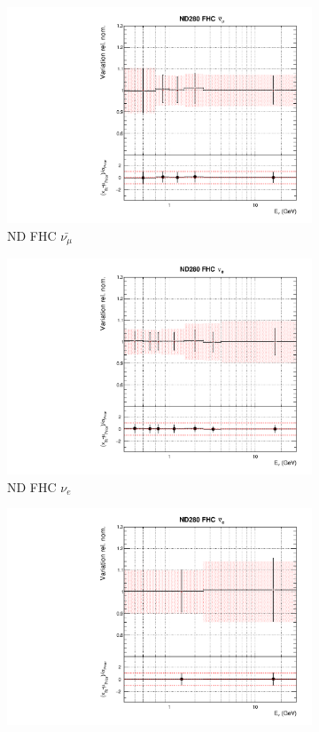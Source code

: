 \begin{figure}
\begin{subfigure}{0.24\textwidth}
  \includegraphics[width=0.95\linewidth]{figs/asmvflux1}
  \caption{ND FHC $\bar{\nu_{\mu}}$}
\end{subfigure}
\begin{subfigure}{0.24\textwidth}
  \centering
  \includegraphics[width=0.95\linewidth]{figs/asmvflux2}
  \caption{ND FHC $\nu_e$}
\end{subfigure}
\begin{subfigure}{0.24\textwidth}
  \centering
  \includegraphics[width=0.95\linewidth]{figs/asmvflux3}

\end{subfigure}
\end{figure}
